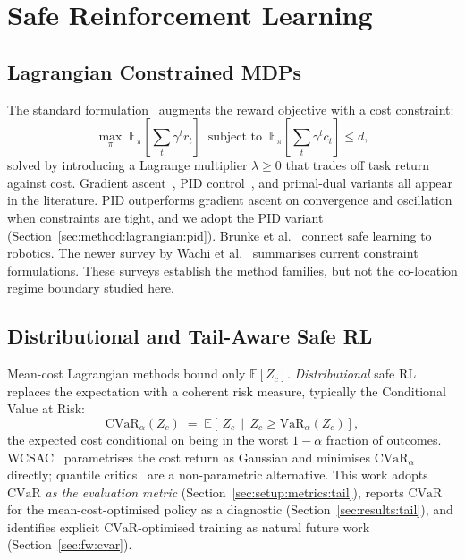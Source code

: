 \documentclass[11pt,a4paper]{report}
\newcommand{\cvar}{\ensuremath{\mathrm{CVaR}}}
\begin{document}
\section{Safe Reinforcement Learning}
\label{sec:bg:safe}

\subsection{Lagrangian Constrained MDPs}
\label{sec:bg:safe:lagr}

The standard formulation~\cite{altman1999constrained,
ray2019safetygym} augments the reward objective with a cost
constraint:
\begin{equation}
  \max_{\pi} \;\mathbb{E}_{\pi}\!\left[\sum_t \gamma^t r_t\right]
  \;\;\text{subject to}\;\;
  \mathbb{E}_{\pi}\!\left[\sum_t \gamma^t c_t\right] \le d,
  \label{eq:cmdp}
\end{equation}
solved by introducing a Lagrange multiplier $\lambda \ge 0$ that
trades off task return against cost. Gradient
ascent~\cite{ray2019safetygym}, PID
control~\cite{stooke2020pid}, and primal-dual variants all appear in
the literature. PID outperforms gradient ascent on convergence and
oscillation when constraints are tight, and we adopt the PID variant
(Section~\ref{sec:method:lagrangian:pid}). Brunke et
al.~\cite{brunke2022safelearning} connect safe learning to robotics.
The newer survey by Wachi et al.~\cite{wachi2024constraint} summarises
current constraint formulations. These surveys establish the method
families, but not the co-location regime boundary studied here.

\subsection{Distributional and Tail-Aware Safe RL}
\label{sec:bg:safe:distr}

Mean-cost Lagrangian methods bound only $\mathbb{E}[Z_c]$.
\emph{Distributional} safe RL replaces the expectation with a
coherent risk measure, typically the Conditional Value at Risk:
\begin{equation}
  \cvar_{\alpha}(Z_c) \;=\;
  \mathbb{E}\!\left[\, Z_c \,\middle|\, Z_c \ge \mathrm{VaR}_{\alpha}(Z_c) \right],
  \label{eq:cvar-def}
\end{equation}
the expected cost conditional on being in the worst $1-\alpha$
fraction of outcomes. WCSAC~\cite{yang2021wcsac}
parametrises the cost return as Gaussian and minimises
$\cvar_{\alpha}$ directly;
quantile critics~\cite{dabney2018qrdqn} are a non-parametric
alternative. This work adopts \cvar{} \emph{as the evaluation
metric} (Section~\ref{sec:setup:metrics:tail}), reports \cvar{} for
the mean-cost-optimised policy as a diagnostic
(Section~\ref{sec:results:tail}), and identifies explicit
\cvar{}-optimised training as natural future work
(Section~\ref{sec:fw:cvar}).
\end{document}
